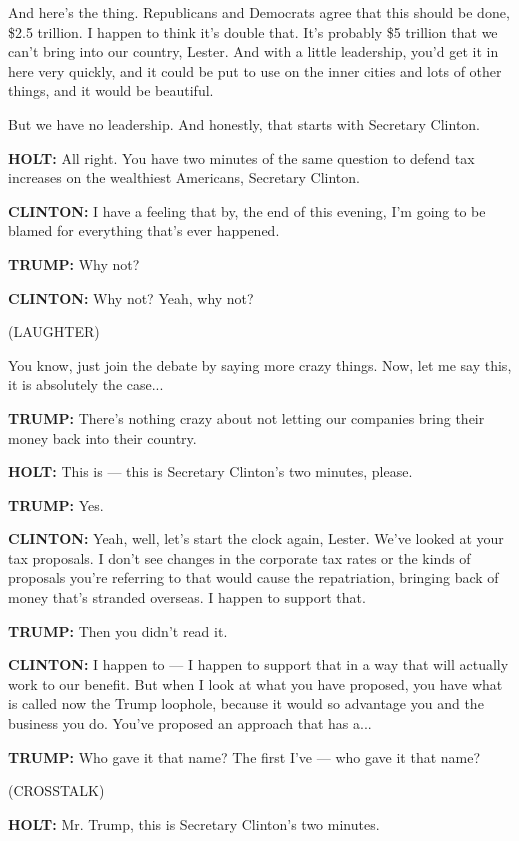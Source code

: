 And here's the thing. Republicans and Democrats agree that this should
be done, \$2.5 trillion. I happen to think it's double that. It's
probably \$5 trillion that we can't bring into our country, Lester. And
with a little leadership, you'd get it in here very quickly, and it
could be put to use on the inner cities and lots of other things, and it
would be beautiful.

But we have no leadership. And honestly, that starts with Secretary
Clinton.

\textbf{HOLT:} All right. You have two minutes of the same question to
defend tax increases on the wealthiest Americans, Secretary Clinton.

\textbf{CLINTON:} I have a feeling that by, the end of this evening, I'm
going to be blamed for everything that's ever happened.

\textbf{TRUMP:} Why not?

\textbf{CLINTON:} Why not? Yeah, why not?

(LAUGHTER)

You know, just join the debate by saying more crazy things. Now, let me
say this, it is absolutely the case...

\textbf{TRUMP:} There's nothing crazy about not letting our companies
bring their money back into their country.

\textbf{HOLT:} This is --- this is Secretary Clinton's two minutes,
please.

\textbf{TRUMP:} Yes.

\textbf{CLINTON:} Yeah, well, let's start the clock again, Lester. We've
looked at your tax proposals. I don't see changes in the corporate tax
rates or the kinds of proposals you're referring to that would cause the
repatriation, bringing back of money that's stranded overseas. I happen
to support that.

\textbf{TRUMP:} Then you didn't read it.

\textbf{CLINTON:} I happen to --- I happen to support that in a way that
will actually work to our benefit. But when I look at what you have
proposed, you have what is called now the Trump loophole, because it
would so advantage you and the business you do. You've proposed an
approach that has a...

\textbf{TRUMP:} Who gave it that name? The first I've --- who gave it
that name?

(CROSSTALK)

\textbf{HOLT:} Mr. Trump, this is Secretary Clinton's two minutes.


